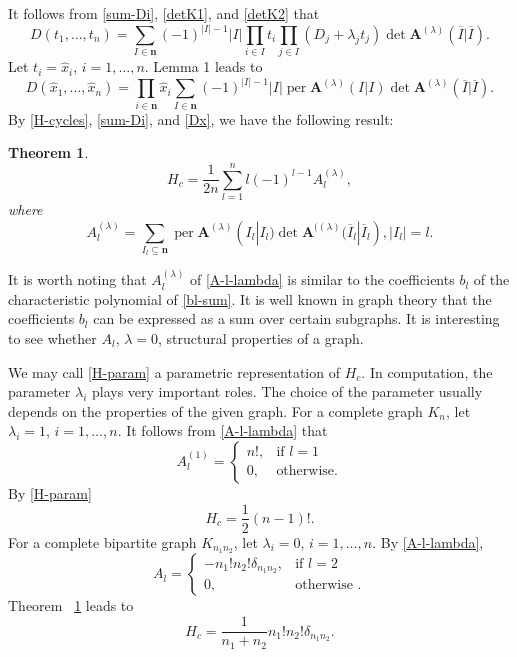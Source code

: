 \documentclass[draft]{amsart}
\newtheorem{thm}{Theorem}[section]
\theoremstyle{definition}
\theoremstyle{remark}
\newcommand{\per}{\operatorname{per}}
\begin{document}
It follows from \eqref{sum-Di}, \eqref{detK1}, and \eqref{detK2} that
\begin{equation}\label{Dt}
D(t_1,\dots,t_n)=\sum_{I\in\mathbf{n}}(-1)^{|I|-1}|I|
\prod_{i\in I}t_i\prod_{j\in I}(D_j+\lambda_jt_j)\det\mathbf{A}^{(\lambda)}
(\overline I|\overline I).
\end{equation}
Let $t_i=\hat x_i$, $i=1,\dots,n$. Lemma 1 leads to
\begin{equation}\label{Dx}
D(\hat x_1,\dots,\hat x_n)=\prod_{i\in\mathbf{n}}\hat x_i
\sum_{I\in\mathbf{n}}(-1)^{|I|-1}|I|\per \mathbf{A}
^{(\lambda)}(I|I)\det\mathbf{A}^{(\lambda)}(\overline I|\overline I).
\end{equation}
By \eqref{H-cycles}, \eqref{sum-Di}, and \eqref{Dx},
we have the following result:
\begin{thm}\label{thm-H-param}
\begin{equation}\label{H-param}
H_c=\frac{1}{2n}\sum^n_{l =1}l (-1)^{l -1}A_{l}
^{(\lambda)},
\end{equation}
where
\begin{equation}\label{A-l-lambda}
A^{(\lambda)}_l =\sum_{I_l \subseteq\mathbf{n}}\per \mathbf{A}
^{(\lambda)}(I_l |I_l )\det\mathbf{A}^{((\lambda)}
(\overline I_{l}|\overline I_l ),|I_{l}|=l .
\end{equation}
\end{thm}

It is worth noting that $A_l ^{(\lambda)}$ of \eqref{A-l-lambda} is
similar to the coefficients $b_l $ of the characteristic polynomial of
\eqref{bl-sum}. It is well known in graph theory that the coefficients
$b_l $ can be expressed as a sum over certain subgraphs. It is
interesting to see whether $A_l $, $\lambda=0$, structural properties
of a graph.

We may call \eqref{H-param} a parametric representation of $H_c$. In
computation, the parameter $\lambda_i$ plays very important roles. The
choice of the parameter usually depends on the properties of the given
graph. For a complete graph $K_n$, let $\lambda_i=1$, $i=1,\dots,n$.
It follows from \eqref{A-l-lambda} that
\begin{equation}\label{compl-gr}
A^{(1)}_l =\begin{cases} n!,&\text{if }l =1\\
0,&\text{otherwise}.\end{cases}
\end{equation}
By \eqref{H-param}
\begin{equation}
H_c=\frac 12(n-1)!.
\end{equation}
For a complete bipartite graph $K_{n_1n_2}$, let $\lambda_i=0$, $i=1,\dots,n$.
By \eqref{A-l-lambda},
\begin{equation}
A_l =
\begin{cases} -n_1!n_2!\delta_{n_1n_2},&\text{if }l =2\\
0,&\text{otherwise }.\end{cases}
\label{compl-bip-gr}
\end{equation}
Theorem ~\ref{thm-H-param}
leads to
\begin{equation}
H_c=\frac1{n_1+n_2}n_1!n_2!\delta_{n_1n_2}.
\end{equation}
\end{document}
